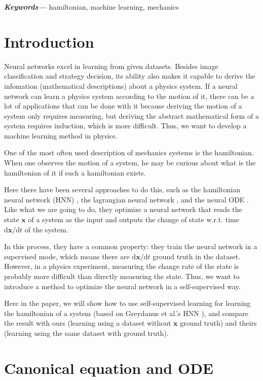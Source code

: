 \documentclass{article}
\providecommand{\keywords}[1]
{
  \small	
  \textbf{\textit{Keywords---}} #1
}
\begin{document}
\keywords{hamiltonian, machine learning, mechanics}

\tableofcontents

\section{Introduction}

Neural networks excel in learning from given datasets.
Besides image classification and strategy decision,
its ability also makes it capable to derive the infomation (mathematical descriptions) about a physics system.
If a neural network can learn a physics system according to the motion of it,
there can be a lot of applications that can be done with it
because deriving the motion of a system only requires measuring,
but deriving the abstract mathematical form of a system requires induction,
which is more difficult.
Thus, we want to develop a machine learning method in physics.

One of the most often used description of mechanics systems is the hamiltonian.
When one observes the motion of a system,
he may be curious about what is the hamiltonian of it
if such a hamiltonian exists.

Here there have been several approaches to do this,
such as the hamiltonian neural network (HNN) \cite{greydanus2019hamiltonian},
the lagrangian neural network \cite{cranmer2020lagrangian},
and the neural ODE \cite{chen2018ode}.
Like what we are going to do,
they optimize a neural network that reads the state $\mathbf x$ of a system as the input
and outputs the change of state w.r.t. time $\mathrm d\mathbf x/\mathrm dt$ of the system.

In this process, they have a common property:
they train the neural network in a supervised mode,
which means there are $\mathrm d\mathbf x/\mathrm dt$ ground truth in the dataset.
However, in a physics experiment, measuring the change rate of the state is probably more difficult than directly measuring the state.
Thus, we want to introduce a method to optimize the neural network in a self-supervised way.

Here in the paper, we will show how to use self-supervised learning for learning the hamiltonian of a system (based on Greydanus et al.'s HNN \cite{greydanus2019hamiltonian}),
and compare the result with ours (learning using a dataset without $\dot{\mathbf x}$ ground truth) and theirs (learning using the same dataset with ground truth).

\section{Canonical equation and ODE}
\end{document}
